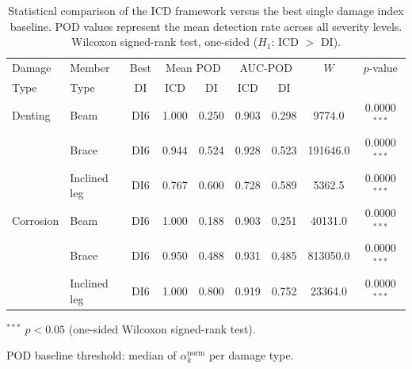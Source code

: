 \begin{table}[htbp]
  \centering
  \caption{Statistical comparison of the ICD framework versus the best single damage index baseline. POD values represent the mean detection rate across all severity levels. Wilcoxon signed-rank test, one-sided ($H_1$: ICD $>$ DI).}
  \label{tab:wilcoxon_POD}
  \begin{threeparttable}
  \begin{tabular}{llccccccc}
    \toprule
    Damage & Member & Best & \multicolumn{2}{c}{Mean POD} & \multicolumn{2}{c}{AUC-POD} & $W$ & $p$-value \\
    Type & Type & DI & ICD & DI & ICD & DI & & \\
    \midrule
    Denting & Beam & DI6 & 1.000 & 0.250 & 0.903 & 0.298 & 9774.0 & 0.0000$^{***}$ \\
     & Brace & DI6 & 0.944 & 0.524 & 0.928 & 0.523 & 191646.0 & 0.0000$^{***}$ \\
     & Inclined leg & DI6 & 0.767 & 0.600 & 0.728 & 0.589 & 5362.5 & 0.0000$^{***}$ \\
    \midrule
    Corrosion & Beam & DI6 & 1.000 & 0.188 & 0.903 & 0.251 & 40131.0 & 0.0000$^{***}$ \\
     & Brace & DI6 & 0.950 & 0.488 & 0.931 & 0.485 & 813050.0 & 0.0000$^{***}$ \\
     & Inclined leg & DI6 & 1.000 & 0.800 & 0.919 & 0.752 & 23364.0 & 0.0000$^{***}$ \\
    \bottomrule
  \end{tabular}
  \begin{tablenotes}[para]\small
    \item $^{***}$ $p < 0.05$ (one-sided Wilcoxon signed-rank test).
    \item POD baseline threshold: median of $\alpha_k^{\text{norm}}$ per damage type.
  \end{tablenotes}
  \end{threeparttable}
\end{table}